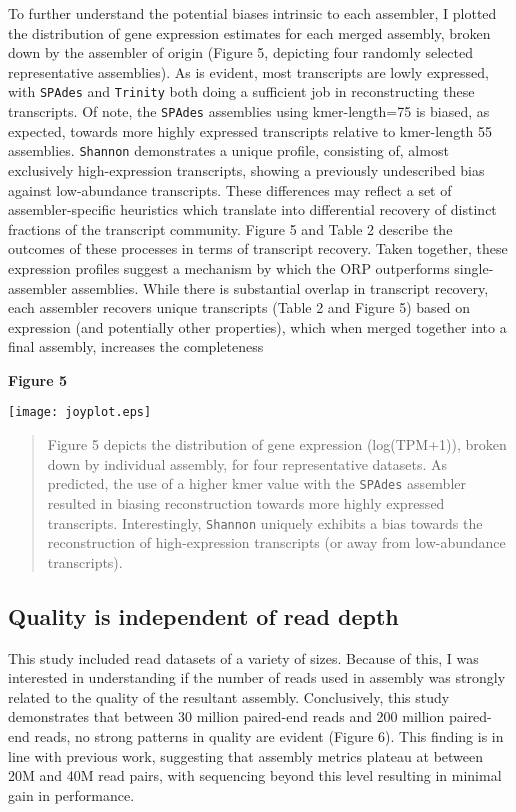 \documentclass[10pt,letterpaper]{article}
\begin{document}
To further understand the potential biases intrinsic to each assembler, I plotted the distribution of gene expression estimates for each merged assembly, broken down by the assembler of origin (Figure 5, depicting four randomly selected representative assemblies). As is evident, most transcripts are lowly expressed, with \texttt{SPAdes} and \texttt{Trinity} both doing a sufficient job in reconstructing these transcripts. Of note, the \texttt{SPAdes} assemblies using kmer-length=75 is biased, as expected, towards more highly expressed transcripts relative to kmer-length 55 assemblies. \texttt{Shannon} demonstrates a unique profile, consisting of, almost exclusively high-expression transcripts, showing a previously undescribed bias against low-abundance transcripts. These differences may reflect a set of assembler-specific heuristics which translate into differential recovery of distinct fractions of the transcript community. Figure 5 and Table 2 describe the outcomes of these processes in terms of transcript recovery. Taken together, these expression profiles suggest a mechanism by which the ORP outperforms single-assembler assemblies. While there is substantial overlap in transcript recovery, each assembler recovers unique transcripts (Table 2 and Figure 5) based on expression (and potentially other properties), which when merged together into a final assembly, increases the completeness 

 

\textbf{\hypertarget{Figure 5}{Figure 5}} \\
\centerline{\texttt{[image: joyplot.eps]}}
\begin{quote}
\small{Figure 5 depicts the distribution of gene expression (log(TPM+1)), broken down by individual assembly, for four representative datasets. As predicted, the use of a higher kmer value with the \texttt{SPAdes} assembler resulted in biasing reconstruction towards more highly expressed transcripts. Interestingly, \texttt{Shannon} uniquely exhibits a bias towards the reconstruction of high-expression transcripts (or away from low-abundance transcripts).}
\end{quote} 


\subsection{Quality is independent of read depth}

This study included read datasets of a variety of sizes. Because of this, I was interested in understanding if the number of reads used in assembly was strongly related to the quality of the resultant assembly. Conclusively, this study demonstrates that between 30 million paired-end reads and 200 million paired-end reads, no strong patterns in quality are evident (Figure 6). This finding is in line with previous work, \citep{MacManes:2015iz} suggesting that assembly metrics plateau at between 20M and 40M read pairs, with sequencing beyond this level resulting in minimal gain in performance.  
\end{document}
